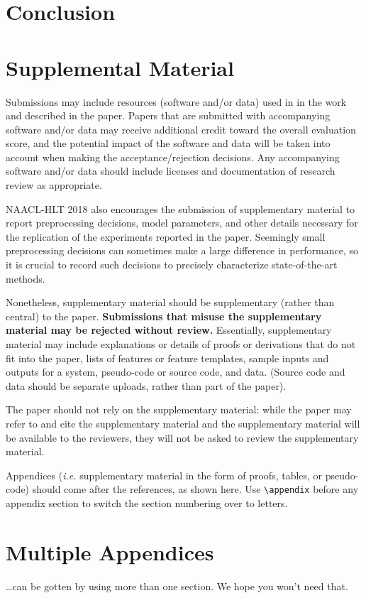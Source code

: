 \documentclass[11pt,a4paper]{article}
\begin{document}
\section*{Conclusion}
%
%



\appendix

\section{Supplemental Material}
\label{sec:supplemental}
Submissions may include resources (software and/or data) used in in the work and described in the paper. Papers that are submitted with accompanying software and/or data may receive additional credit toward the overall evaluation score, and the potential impact of the software and data will be taken into account when making the acceptance/rejection decisions. Any accompanying software and/or data should include licenses and documentation of research review as appropriate.


NAACL-HLT 2018 also encourages the submission of supplementary material to report preprocessing decisions, model parameters, and other details necessary for the replication of the experiments reported in the paper. Seemingly small preprocessing decisions can sometimes make a large difference in performance, so it is crucial to record such decisions to precisely characterize state-of-the-art methods. 

Nonetheless, supplementary material should be supplementary (rather
than central) to the paper. {\bf Submissions that misuse the supplementary 
material may be rejected without review.}
Essentially, supplementary material may include explanations or details
of proofs or derivations that do not fit into the paper, lists of
features or feature templates, sample inputs and outputs for a system,
pseudo-code or source code, and data. (Source code and data should
be separate uploads, rather than part of the paper).

The paper should not rely on the supplementary material: while the paper
may refer to and cite the supplementary material and the supplementary material will be available to the
reviewers, they will not be asked to review the
supplementary material.


Appendices ({\em i.e.} supplementary material in the form of proofs, tables,
or pseudo-code) should come after the references, as shown here. Use
\verb|\appendix| before any appendix section to switch the section
numbering over to letters.

\section{Multiple Appendices}
\dots can be gotten by using more than one section. We hope you won't
need that.
\end{document}
